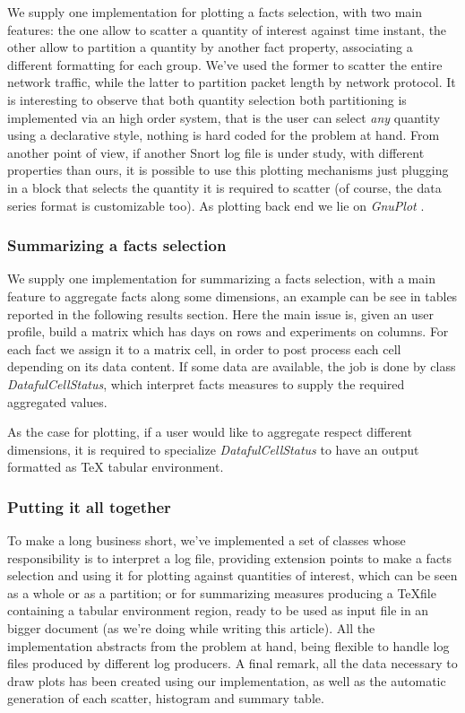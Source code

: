 \documentclass[10pt,a4paper]{article}
\begin{document}
    We supply one implementation for plotting a facts selection, with
    two main features: the one allow to scatter a quantity of interest
    against time instant, the other allow to partition a quantity by
    another fact property, associating a different formatting for each
    group. We've used the former to scatter the entire network
    traffic, while the latter to partition packet length by network
    protocol. It is interesting to observe that both quantity
    selection both partitioning is implemented via an high order
    system, that is the user can select \emph{any} quantity using a
    declarative style, nothing is hard coded for the problem at
    hand. From another point of view, if another Snort log file is
    under study, with different properties than ours, it is possible
    to use this plotting mechanisms just plugging in a block that
    selects the quantity it is required to scatter (of course, the
    data series format is customizable too). As plotting back end we
    lie on \emph{GnuPlot} \cite{gnuplot}.

    \subsubsection{Summarizing a facts selection}

    We supply one implementation for summarizing a facts selection,
    with a main feature to aggregate facts along some dimensions, an
    example can be see in tables reported in the following results
    section. Here the main issue is, given an user profile, build a
    matrix which has days on rows and experiments on columns. For each
    fact we assign it to a matrix cell, in order to post process each
    cell depending on its data content. If some data are available,
    the job is done by class \emph{DatafulCellStatus}, which interpret
    facts measures to supply the required aggregated values.

    As the case for plotting, if a user would like to aggregate
    respect different dimensions, it is required to specialize
    \emph{DatafulCellStatus} to have an output formatted as \TeX
    tabular environment.

    \subsubsection{Putting it all together}
    
    To make a long business short, we've implemented a set of classes
    whose responsibility is to interpret a log file, providing
    extension points to make a facts selection and using it for
    plotting against quantities of interest, which can be seen as a
    whole or as a partition; or for summarizing measures producing a
    \TeX file containing a tabular environment region, ready to be
    used as input file in an bigger document (as we're doing while
    writing this article). All the implementation abstracts from the
    problem at hand, being flexible to handle log files produced by
    different log producers. A final remark, all the data necessary to
    draw plots has been created using our implementation, as well as
    the automatic generation of each scatter, histogram and summary
    table.
    
\end{document}
